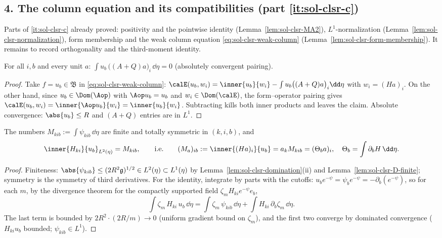 \documentclass[../main.tex]{subfiles}
\begin{document}
\subsection*{4. The column equation and its compatibilities (part \ref{it:sol-clsr-c})}

Parts of \ref{it:sol-clsr-c} already proved: positivity and the pointwise identity
(Lemma~\ref{lem:sol-clsr-MA2}), $L^1$-normalization
(Lemma~\ref{lem:sol-clsr-normalization}), form membership and the weak column equation
\eqref{eq:sol-clsr-weak-column} (Lemma~\ref{lem:sol-clsr-form-membership}).  It remains to
record orthogonality and the third-moment identity.

\begin{lemma}
\label{lem:sol-clsr-orthogonality}
For all $i,b$ and every unit $a$:
$\displaystyle\int u_b\,\bigl((A+Q)a\bigr)_i\,\dd\eta=0$ (absolutely convergent pairing).
\end{lemma}

\begin{proof}
Take $f=u_b\in\mathfrak B$ in \eqref{eq:sol-clsr-weak-column}:
$\calE(u_b,w_i)=\inner{u_b}{w_i}-\int u_b\bigl((A+Q)a\bigr)_i\dd\eta$ with $w_i=(Ha)_i$.  On
the other hand, since $u_b\in\Dom(\Aop)$ with $\Aop u_b=u_b$ and $w_i\in\Dom(\calE)$, the
form--operator pairing gives $\calE(u_b,w_i)=\inner{\Aop u_b}{w_i}=\inner{u_b}{w_i}$.
Subtracting kills both inner products and leaves the claim.  Absolute convergence:
$\abs{u_b}\le R$ and $(A+Q)$ entries are in $L^1$.
\end{proof}

\begin{lemma}
\label{lem:sol-clsr-M}
The numbers $M_{kib}:=\int\psi_{kib}\,\dd\eta$ are finite and totally symmetric in $(k,i,b)$,
and
\[
  \inner{H_{ki}}{u_b}_{L^2(\eta)}=M_{kib},\qquad\text{i.e.}\qquad
  (M_a)_{ib}:=\inner{(Ha)_i}{u_b}=a_kM_{kib}=(\Theta_ba)_i,\quad
  \Theta_b=\int\partial_bH\,\dd\eta .
\]
\end{lemma}

\begin{proof}
Finiteness: $\abs{\psi_{kib}}\le(2R^2\mathfrak g)^{1/2}\in L^2(\eta)\subset L^1(\eta)$ by
Lemma~\ref{lem:sol-clsr-domination}(ii) and Lemma~\ref{lem:sol-clsr-D-finite}; symmetry is the
symmetry of third derivatives.  For the identity, integrate by parts with the cutoffs:
$u_be^{-\psi}=\psi_be^{-\psi}=-\partial_b(e^{-\psi})$, so for each $m$, by the divergence
theorem for the compactly supported field $\zeta_mH_{ki}e^{-\psi}e_b$,
\[
  \int\zeta_m\,H_{ki}\,u_b\,\dd\eta
  =\int\zeta_m\,\psi_{kib}\,\dd\eta+\int H_{ki}\,\partial_b\zeta_m\,\dd\eta .
\]
The last term is bounded by $2R^2\cdot(2R/m)\to0$ (uniform gradient bound on $\zeta_m$), and
the first two converge by dominated convergence ($H_{ki}u_b$ bounded;
$\psi_{kib}\in L^1$).
\end{proof}
\end{document}
